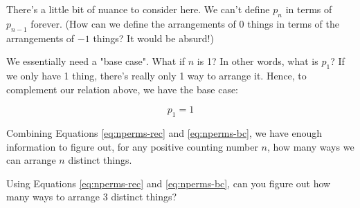
There's a little bit of nuance to consider here. We can't define $p_n$ in terms of $p_{n-1}$ forever. (How can we define the arrangements of 0 things in terms of the arrangements of $-1$ things? It would be absurd!)

We essentially need a "base case". What if $n$ is 1? In other words, what is $p_1$? If we only have 1 thing, there's really only 1 way to arrange it. Hence, to complement our relation above, we have the base case:

\begin{equation}
\label{eq:nperms-bc}
p_1 = 1
\end{equation}

Combining Equations \ref{eq:nperms-rec} and \ref{eq:nperms-bc}, we have enough information to figure out, for any positive counting number $n$, how many ways we can arrange $n$ distinct things.

\begin{exercise}
Using Equations \ref{eq:nperms-rec} and \ref{eq:nperms-bc}, can you figure out how many ways to arrange 3 distinct things?
\end{exercise}






